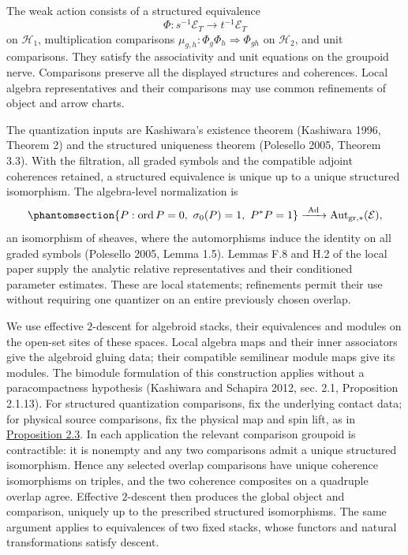 \documentclass[
  english,
  11pt,
  reqno]{amsart}
\newcounter{none} %
\begin{document}
The weak action consists of a structured equivalence \[
\Phi:s^{-1}\mathscr E_T\longrightarrow t^{-1}\mathscr E_T
\] on \(\mathcal H_1\), multiplication comparisons
\(\mu_{g,h}:\Phi_g\Phi_h\Longrightarrow\Phi_{gh}\) on \(\mathcal H_2\),
and unit comparisons. They satisfy the associativity and unit equations
on the groupoid nerve. Comparisons preserve all the displayed structures
and coherences. Local algebra representatives and their comparisons may
use common refinements of object and arrow charts.

The quantization inputs are Kashiwara's existence theorem (Kashiwara
1996, Theorem 2) and the structured uniqueness theorem (Polesello 2005,
Theorem 3.3). With the filtration, all graded symbols and the compatible
adjoint coherences retained, a structured equivalence is unique up to a
unique structured isomorphism. The algebra-level normalization is
\begin{equation}\protect\phantomsection\label{eq:normalized-inner-uniqueness}{
\{P:\operatorname{ord}P=0,\ \sigma_0(P)=1,\ P^*P=1\}
\xrightarrow{\ \operatorname{Ad}\ }
\operatorname{Aut}_{\mathrm{gr},*}(\mathcal E),
}\end{equation} an isomorphism of sheaves, where the automorphisms
induce the identity on all graded symbols (Polesello 2005, Lemma 1.5).
Lemmas F.8 and H.2 of the local paper supply the analytic relative
representatives and their conditioned parameter estimates. These are
local statements; refinements permit their use without requiring one
quantizer on an entire previously chosen overlap.

\protect{}\label{def:effective-structured-descent-v09}

We use effective \(2\)-descent for algebroid stacks, their equivalences
and modules on the open-set sites of these spaces. Local algebra maps
and their inner associators give the algebroid gluing data; their
compatible semilinear module maps give its modules. The bimodule
formulation of this construction applies without a paracompactness
hypothesis (Kashiwara and Schapira 2012, sec. 2.1, Proposition 2.1.13).
For structured quantization comparisons, fix the underlying contact
data; for physical source comparisons, fix the physical map and spin
lift, as in \hyperref[prop:independent-local-operator-input]{Proposition
2.3}. In each application the relevant comparison groupoid is
contractible: it is nonempty and any two comparisons admit a unique
structured isomorphism. Hence any selected overlap comparisons have
unique coherence isomorphisms on triples, and the two coherence
composites on a quadruple overlap agree. Effective \(2\)-descent then
produces the global object and comparison, uniquely up to the prescribed
structured isomorphisms. The same argument applies to equivalences of
two fixed stacks, whose functors and natural transformations satisfy
descent.
\end{document}
